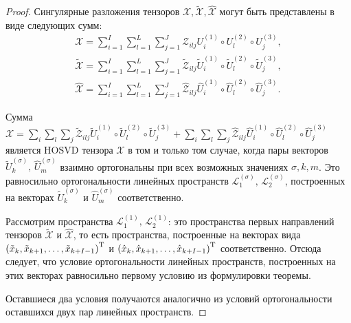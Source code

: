 \documentclass[specialist,
    substylefile=spbu.rtx,
    subf,href,colorlinks=true, 12pt]{disser}
\theoremstyle{plain}
\theoremstyle{definition}
\theoremstyle{remark}
\begin{document}
    \begin{proof}
        Сингулярные разложения тензоров $\mathcal{X}, \widetilde{\mathcal{X}}, \widehat{\mathcal{X}}$
        могут быть представлены в виде
        следующих сумм:
        \[
            \begin{aligned}
                \mathcal{X}=\sum_{i=1}^{I} \sum_{l=1}^{L} \sum_{j=1}^{J} \mathcal{Z}_{ilj} U^{(1)}_{i}
                \circ U^{(2)}_{l} \circ U^{(3)}_{j},\\
                \widetilde{\mathcal{X}}=\sum_{i=1}^{I} \sum_{l=1}^{L} \sum_{j=1}^{J} \widetilde{\mathcal{Z}}_{ilj}
                \widetilde{U}^{(1)}_{i} \circ \widetilde{U}^{(2)}_{l} \circ \widetilde{U}^{(3)}_{j},\\
                \widehat{\mathcal{X}}=\sum_{i=1}^{I} \sum_{l=1}^{L} \sum_{j=1}^{J} \widehat{\mathcal{Z}}_{ilj}
                \widehat{U}^{(1)}_{i} \circ \widehat{U}^{(2)}_{l} \circ \widehat{U}^{(3)}_{j}.
            \end{aligned}
        \]

        Сумма $\mathcal{X} = \sum_{i} \sum_{l} \sum_{j} \widetilde{\mathcal{Z}}_{ilj}
        \widetilde{U}^{(1)}_{i} \circ \widetilde{U}^{(2)}_{l} \circ \widetilde{U}^{(3)}_{j} +
        \sum_{i} \sum_{l} \sum_{j} \widehat{\mathcal{Z}}_{ilj} \widehat{U}^{(1)}_{i} \circ \widehat{U}^{(2)}_{l}
        \circ \widehat{U}^{(3)}_{j}$ является HOSVD тензора $\mathcal{X}$ в том и только том случае, когда
        пары векторов $\widetilde{U}^{(\sigma)}_{k},\, \widehat{U}^{(\sigma)}_{m}$ взаимно ортогональны
        при всех возможных значениях $\sigma, k, m$.
        Это равносильно ортогональности линейных пространств $\mathcal{L}^{(\sigma)}_{1},\, \mathcal{L}^{(\sigma)}_{2}$,
        построенных на векторах $\widetilde{U}^{(\sigma)}_{k}$ и $\widehat{U}^{(\sigma)}_{m}$ соответственно.

        Рассмотрим пространства $\mathcal{L}^{(1)}_{1},\, \mathcal{L}^{(1)}_{2}$: это пространства первых направлений
        тензоров $\widetilde{\mathcal{X}}$ и $\widehat{\mathcal{X}}$, то есть пространства, построенные на векторах вида $\left(\tilde{x}_k, \tilde{x}_{k+1}, \ldots, \tilde{x}_{k+I-1}\right)^{\mathrm{T}}$ и
        $\left(\hat{x}_k, \hat{x}_{k+1}, \ldots, \hat{x}_{k+I-1}\right)^{\mathrm{T}}$ соответственно.
        Отсюда следует, что условие ортогональности линейных пространств, построенных на этих векторах
        равносильно первому условию из формулировки теоремы.

        Оставшиеся два условия получаются аналогично из условий ортогональности оставшихся двух пар линейных пространств.
    \end{proof}
\end{document}
